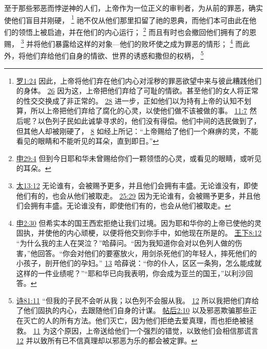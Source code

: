 \documentclass[12pt, a4paper, oneside]{ctexart}
\newcounter{parnum}[section]
\newcommand{\N}{%
   \noindent\refstepcounter{parnum}%
    \makebox[\parindent][l]{\textbf{\arabic{parnum}.}}}
\begin{document}
\N 至于那些邪恶而悖逆神的人们，上帝作为一位正义的审判者，为从前的罪恶，确实使他们盲目并刚硬，
	\footnote {
		\href{https://biblehub.com/romans/1-24.htm}{罗1:24} 因此，上帝将他们弃在他们内心对淫秽的罪恶欲望中来与彼此糟践他们的身体。
		\href{https://biblehub.com/romans/1-26.htm}{26} 因为这，上帝把他们弃给了可耻的情欲。甚至他们的女人将正常的性交交换成了非正常的。
		\href{https://biblehub.com/romans/1-28.htm}{28} 进一步，正如他们以为持有上帝的认知不划算，所以上帝把他们弃给了腐化的心灵，以使他们做不该被做的事。
		\href{https://biblehub.com/romans/11-7.htm}{11:7} 然后呢？以色列子民如此诚挚寻求的，他们没有得偿。他们中间的选民做到了，但其他人却被刚硬了，
		\href{https://biblehub.com/romans/11-8.htm}{8} 如经上所记：“上帝赐给了他们一个麻痹的灵，不能看见的眼睛和不能听见的耳朵，直到即日。”
	}
	祂不仅从他们那里扣留了祂的恩典，而他们本可由此在他们的领悟上被启迪，并在他们的内心运行；
	\footnote {
		\href{https://biblehub.com/deuteronomy/29-4.htm}{申29:4} 但到今日耶和华未曾赐给你们一颗领悟的心灵，或看见的眼睛，或听见的耳朵。
	}
	而且有时也会撤回他们拥有了的恩赐，
	\footnote {
		\href{https://biblehub.com/matthew/13-12.htm}{太13:12} 无论谁有，会被赐予更多，并且他们会拥有丰盛。无论谁没有，即使他们有的，也会从他们被取走。
		\href{https://biblehub.com/matthew/25-29.htm}{25:29} 因为无论谁有，会被赐予更多，并且他们会拥有丰盛。无论谁没有，即使他们有的，也会从他们被取走。
	}
	并将他们暴露给这样的对象---他们的败坏使之成为罪恶的情形；
	\footnote {
		\href{https://biblehub.com/deuteronomy/2-30.htm}{申2:30} 但希实本的国王西宏拒绝让我们过境。因为耶和华你的上帝已使他的灵固执，并使他的内心顽梗，以便将他交到你手中，如他现在所是的。
		\href{https://biblehub.com/2_kings/8-12.htm}{王下8:12} “为什么我的主人在哭泣？”哈薛问。“因为我知道你会对以色列人做的伤害，”他回答。“你会对他们的要塞放火，用剑杀死他们的年轻人，摔死他们的小孩子，剖开他们的孕妇。”
		\href{https://biblehub.com/2_kings/8-13.htm}{13} 哈薛说：“你的仆人，区区一条狗，怎么能成就这样的一件业绩呢？”“耶和华已向我表明，你会成为亚兰的国王，”以利沙回答。
	}
	而此外，将他们弃给他们自身的情欲、世界的诱惑和撒但的权柄，
	\footnote {
		\href{https://biblehub.com/psalms/81-11.htm}{诗81:11} “但我的子民不会听从我；以色列不会服从我。
		\href{https://biblehub.com/psalms/81-12.htm}{12} 所以我把他们弃给了他们固执的内心，去跟随他们自身的计谋。
		\href{https://biblehub.com/2_thessalonians/2-10.htm}{帖后2:10} 以及邪恶欺骗那些正在灭亡的人的所有方法。他们灭亡，因为他们拒绝去爱真理，而也拒绝被拯救。
		\href{https://biblehub.com/2_thessalonians/2-11.htm}{11} 为这个原因，上帝送给他们一个强烈的错觉，以致他们会相信那谎言
		\href{https://biblehub.com/2_thessalonians/2-12.htm}{12} 并以致所有已不信真理却以邪恶为乐的都会被定罪。
	}
\end{document}
